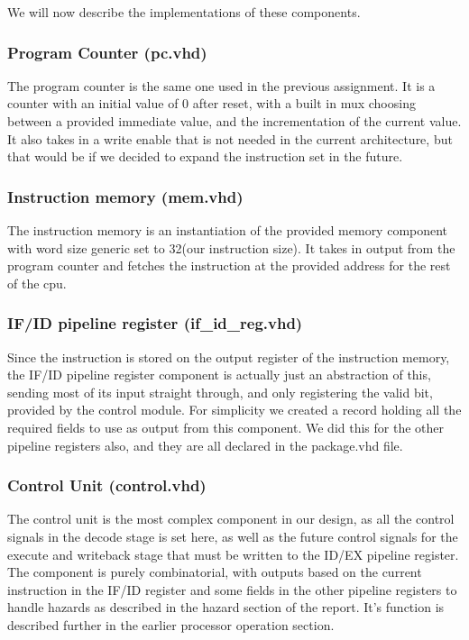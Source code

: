 \documentclass[11pt]{report}
\begin{document}
We will now describe the implementations of these components.
\subsubsection*{Program Counter (pc.vhd)}
The program counter is the same one used in the previous assignment. 
It is a counter with an initial value of 0 after reset, with a built in
mux choosing between a provided immediate value, and the incrementation of
the current value. It also takes in a write enable that is not needed in
the current architecture, but that would be if we decided to expand the 
instruction set in the future.

\subsubsection*{Instruction memory (mem.vhd)}
The instruction memory is an instantiation of the provided memory component
with word size generic set to 32(our instruction size). It takes in
output from the program counter and fetches the instruction at the provided
address for the rest of the cpu.
\subsubsection*{IF/ID pipeline register (if\_id\_reg.vhd)}
Since the instruction is stored on the output register of the instruction memory,
the IF/ID pipeline register component is actually just an abstraction of this, sending 
most of its input straight through, and only registering the valid bit, provided by
the control module. For simplicity we created a record holding all the required fields
to use as output from this component. We did this for the other pipeline registers
also, and they are all declared in the package.vhd file.

\subsubsection*{Control Unit (control.vhd)}

The control unit is the most complex component in our design, as all the control
signals in the decode stage is set here, as well as the future control signals for
the execute and writeback stage that must be written to the ID/EX pipeline register.
The component is purely combinatorial, with outputs based on the current instruction in the
IF/ID register and some fields in the other pipeline registers to handle hazards as
described in the hazard section of the report. It's function is described further in the 
earlier processor operation section.
\end{document}
